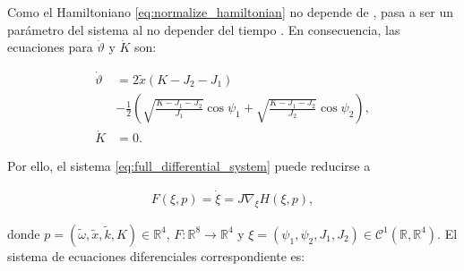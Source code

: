 Como el Hamiltoniano \eqref{eq:normalize_hamiltonian} no depende de ,
 pasa a ser un parámetro del sistema
al no depender del tiempo . En consecuencia, las ecuaciones
para $\dot{\vartheta}$ y $\dot{K}$ son:

\begin{equation}
    \begin{split}
        \dot{\vartheta} & = 2 \tilde{x} (K - J_{2} - J_{1})                                  \\
                        & - \frac{1}{2} \left( \sqrt{ \frac{K - J_1 - J_2}{J_1} } \cos\psi_1
        + \sqrt{\frac{K - J_1 - J_2}{J_2}} \cos\psi_2 \right),                               \\
        \dot{K}         & = 0.
    \end{split}
    \label{eq:independent_variables}
\end{equation}

Por ello, el sistema \eqref{eq:full_differential_system} puede reducirse a

\begin{equation}
    \begin{split}
        F(\xi, p) = \dot{\xi} = J\nabla_{\xi} H (\xi, p),
    \end{split}
    \label{eq:differential_system}
\end{equation}

\noindent donde $p = (\tilde{\omega}, \tilde{x}, \tilde{k}, K) \in \mathbb{R}^4$, $F: \mathbb{R}^8 \rightarrow \mathbb{R}^4$ y
$ \xi = (\psi_1, \psi_2, J_1, J_2) \in \mathcal{C}^1(\mathbb{R}, \mathbb{R}^4) $. El sistema de ecuaciones diferenciales
correspondiente es:

